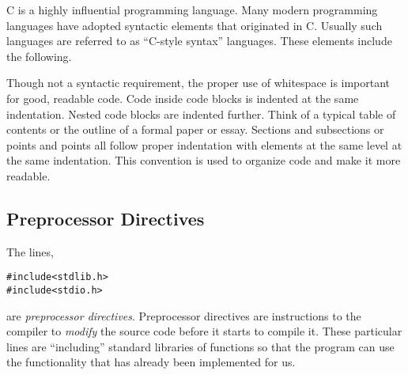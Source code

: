 C is a highly influential programming language.  Many modern programming
languages have adopted syntactic elements that originated in C.  Usually
such languages are referred to as ``C-style syntax'' languages.  These
elements include the following.

Though not a syntactic requirement, the proper use of whitespace is important for
good, readable code.  Code inside code blocks is indented at the same indentation.
Nested code blocks are indented further.  Think of a typical table of contents or
the outline of a formal paper or essay.  Sections and subsections or points and 
points all follow proper indentation with elements at the same level at the same
indentation.  This convention is used to organize code and make it more readable.
 
\subsection{Preprocessor Directives}

The lines, 

\begin{verbatim}
#include<stdlib.h>
#include<stdio.h>
\end{verbatim}

are \emph{preprocessor directives}.  Preprocessor directives are instructions to
the compiler to \emph{modify} the source code before it starts to compile it.  These
particular lines are ``including'' standard libraries of functions so that the program can
use the functionality that has already been implemented for us.  

